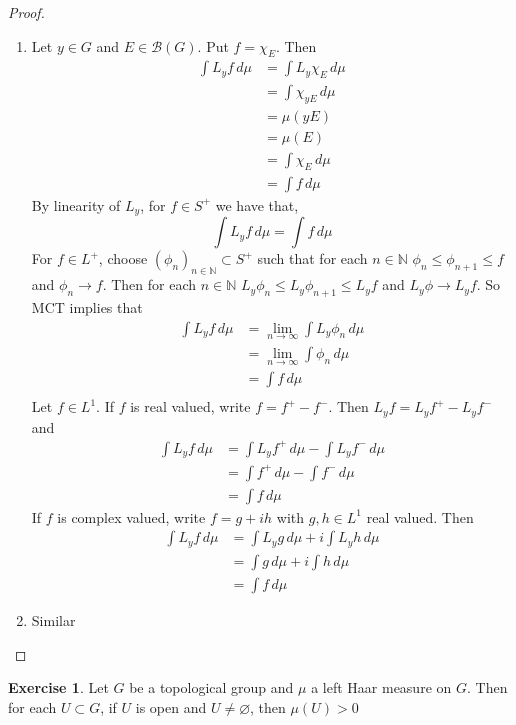 \documentclass[12pt]{amsart}
\theoremstyle{definition}
\newtheorem{ex}[definition]{Exercise}
\newcommand{\N}{\mathbb{N}}
\newcommand{\MB}{\mathcal{B}}
\newcommand{\dmu}{\, d \mu}
\newcommand{\limn}{\lim \limits_{n \rightarrow \infty}}
\newcommand{\seq}[2]{(#1_{#2})_{#2 \in \N}}
\newcommand{\lex}[1]{\label{ex:#1}}
\begin{document}
	\begin{proof}\
		\begin{enumerate}
			\item Let $y \in G$ and $E \in \MB(G)$. Put $f = \chi_E$. Then 
			\begin{align*}
				\int L_y f \dmu 
				& = \int L_y\chi_E \dmu \\
				& =  \int \chi_{yE} \dmu \\
				& = \mu(yE) \\
				& = \mu(E) \\
				& = \int \chi_E \dmu \\
				& = \int f \dmu
			\end{align*} 
			By linearity of $L_y$, for $f \in S^+$ we have that, $$\int L_y f \dmu = \int f \dmu$$ For $f \in L^+$, choose $\seq{\phi}{n} \subset S^+$ such that for each $n \in \N$ $\phi_n \leq \phi_{n+1} \leq f$ and $\phi_n \rightarrow f$. Then for each $n \in \N$ $L_y \phi_n \leq L_y \phi_{n+1} \leq L_y f$ and $L_y \phi \rightarrow L_y f$. So MCT implies that 
			\begin{align*}
				\int L_y f \dmu 
				& = \limn \int L_y \phi_n \dmu \\
				& = \limn \int \phi_n \dmu \\
				& = \int f \dmu \\
			\end{align*}
			Let $f \in L^1$. If $f$ is real valued, write $f = f^+ - f^-$. Then $L_y f = L_y f^+ - L_y f^-$ and 
			\begin{align*}
				\int L_yf \dmu 
				& = \int L_y f^+ \dmu - \int L_y f^- \dmu \\
				& = \int f^+ \dmu - \int f^- \dmu \\
				& = \int f \dmu
			\end{align*}
			If $f$ is complex valued, write $f = g + ih$ with $g, h \in L^1$ real valued. Then 
			\begin{align*}
				\int L_yf \dmu 
				& = \int L_y g \dmu + i \int L_y h \dmu \\
				& = \int g \dmu +i \int h \dmu \\
				& = \int f \dmu
			\end{align*}
			\item Similar
		\end{enumerate}
	\end{proof}
	
	\begin{ex} \lex{00000} 
		Let $G$ be a topological group and $\mu$ a left Haar measure on $G$. Then for each $U \subset G$, if $U$ is open and $U \neq \varnothing$, then $\mu(U) > 0$
	\end{ex}
\end{document}
